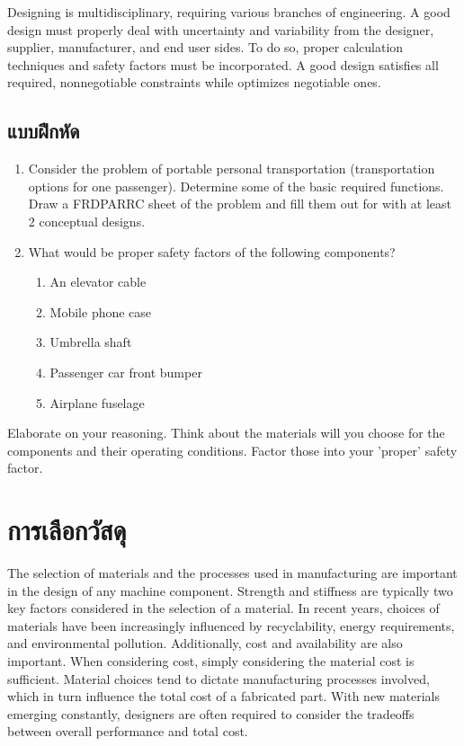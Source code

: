 \documentclass[a4paper,openany,12pt]{book}
\begin{document}
Designing is multidisciplinary, requiring various branches of
engineering. A good design must properly deal with uncertainty and
variability from the designer, supplier, manufacturer, and end user
sides. To do so, proper calculation techniques and safety factors must
be incorporated. A good design satisfies all required, nonnegotiable
constraints while optimizes negotiable ones.

\section{แบบฝึกหัด}
\label{exercises}
\begin{enumerate}
\item Consider the problem of portable personal transportation (transportation options for one passenger). Determine some of the basic required functions. Draw a FRDPARRC sheet of the problem and fill them out for with at least 2 conceptual designs.
\item What would be proper safety factors of the following components?
\begin{enumerate}
\item An elevator cable
\item Mobile phone case
\item Umbrella shaft
\item Passenger car front bumper
\item Airplane fuselage
\end{enumerate}
\end{enumerate}

Elaborate on your reasoning. Think about the materials will you choose for the components and their operating conditions. Factor those into your 'proper' safety factor.

\chapter{การเลือกวัสดุ}
\label{material-selection}
The selection of materials and the processes used in manufacturing are
important in the design of any machine component. Strength and stiffness
are typically two key factors considered in the selection of a material.
In recent years, choices of materials have been increasingly influenced
by recyclability, energy requirements, and environmental pollution.
Additionally, cost and availability are also important. When considering
cost, simply considering the material cost is sufficient. Material
choices tend to dictate manufacturing processes involved, which in turn
influence the total cost of a fabricated part. With new materials
emerging constantly, designers are often required to consider the
tradeoffs between overall performance and total cost.
\end{document}
